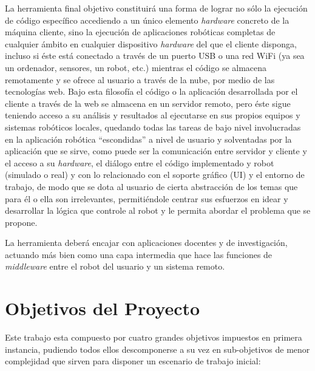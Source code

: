 La herramienta final objetivo constituirá una forma de lograr no sólo la ejecución de código específico accediendo a un único elemento \textit{hardware} concreto de la máquina cliente, sino la ejecución de aplicaciones robóticas completas de cualquier ámbito en cualquier dispositivo \textit{hardware} del que el cliente disponga, incluso si éste está conectado a través de un puerto USB o una red WiFi (ya sea un ordenador, sensores, un robot, etc.) mientras el código se almacena remotamente y se ofrece al usuario a través de la nube, por medio de las tecnologías web. Bajo esta filosofía el código o la aplicación desarrollada por el cliente a través de la web se almacena en un servidor remoto, pero éste sigue teniendo acceso a su análisis y resultados al ejecutarse en sus propios equipos y sistemas robóticos locales, quedando todas las tareas de bajo nivel involucradas en la aplicación robótica ``escondidas'' a nivel de usuario y solventadas por la aplicación que se sirve, como puede ser la comunicación entre servidor y cliente y el acceso a su \textit{hardware}, el diálogo entre el código implementado y robot (simulado o real) y con lo relacionado con el soporte gráfico (UI) y el entorno de trabajo, de modo que se dota al usuario de cierta abstracción de los temas que para él o ella son irrelevantes, permitiéndole centrar sus esfuerzos en idear y desarrollar la lógica que controle al robot y le permita abordar el problema que se propone.

La herramienta deberá encajar con aplicaciones docentes y de investigación, actuando más bien como una capa intermedia que hace las funciones de \textit{middleware} entre el robot del usuario y un sistema remoto.

\section{Objetivos del Proyecto}

Este trabajo esta compuesto por cuatro grandes objetivos impuestos en primera instancia, pudiendo todos ellos descomponerse a su vez en sub-objetivos de menor complejidad que sirven para disponer un escenario de trabajo inicial:

